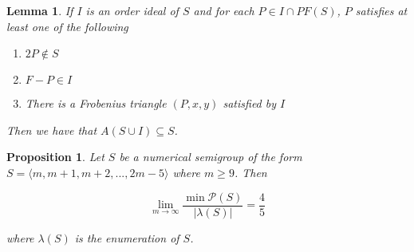 \documentclass[11pt,letterpaper]{article}
\newtheorem{lem}[thm]{Lemma}
\newtheorem{prop}[thm]{Proposition}
\theoremstyle{definition}
\begin{document}
\begin{lem}
    \label{Ideal}
    If $I$ is an order ideal of $S$ and for each $P\in I\cap PF(S)$, $P$ satisfies at least one of the following 
    \begin{enumerate}
        \item $2P\notin S$
        \item $F-P\in I$
        \item There is a Frobenius triangle $(P,x,y)$ satisfied by $I$
    \end{enumerate}
    Then we have that $A(S\cup I)\subseteq S$.
\end{lem}

\begin{prop}
    Let $S$ be a numerical semigroup of the form $S=\langle m,m+1,m+2,...,2m-5\rangle$ where $m\geq 9$. Then

    $$\lim_{m\to\infty}\frac{\min \mathcal{P}(S)}{|\lambda(S)|} = \frac{4}{5}$$

    where $\lambda(S)$ is the enumeration of $S$. 

\end{prop}
\end{document}
